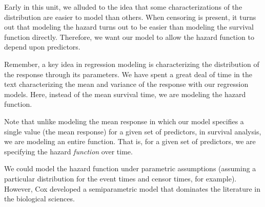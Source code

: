 \documentclass[
  letterpaper,
  DIV=11,
  numbers=noendperiod]{scrreprt}
\theoremstyle{definition}
\theoremstyle{definition}
\theoremstyle{remark}
\begin{document}
Early in this unit, we alluded to the idea that some characterizations
of the distribution are easier to model than others. When censoring is
present, it turns out that modeling the hazard turns out to be easier
than modeling the survival function directly. Therefore, we want our
model to allow the hazard function to depend upon predictors.

\begin{tcolorbox}[enhanced jigsaw, left=2mm, toprule=.15mm, arc=.35mm, breakable, opacitybacktitle=0.6, opacityback=0, rightrule=.15mm, colbacktitle=quarto-callout-note-color!10!white, coltitle=black, leftrule=.75mm, toptitle=1mm, colframe=quarto-callout-note-color-frame, titlerule=0mm, title=\textcolor{quarto-callout-note-color}{\faInfo}\hspace{0.5em}{Note}, bottomrule=.15mm, colback=white, bottomtitle=1mm]

Remember, a key idea in regression modeling is characterizing the
distribution of the response through its parameters. We have spent a
great deal of time in the text characterizing the mean and variance of
the response with our regression models. Here, instead of the mean
survival time, we are modeling the hazard function.

\end{tcolorbox}

\begin{tcolorbox}[enhanced jigsaw, left=2mm, toprule=.15mm, arc=.35mm, breakable, opacitybacktitle=0.6, opacityback=0, rightrule=.15mm, colbacktitle=quarto-callout-note-color!10!white, coltitle=black, leftrule=.75mm, toptitle=1mm, colframe=quarto-callout-note-color-frame, titlerule=0mm, title=\textcolor{quarto-callout-note-color}{\faInfo}\hspace{0.5em}{Note}, bottomrule=.15mm, colback=white, bottomtitle=1mm]

Note that unlike modeling the mean response in which our model specifies
a single value (the mean response) for a given set of predictors, in
survival analysis, we are modeling an entire function. That is, for a
given set of predictors, we are specifying the hazard \emph{function}
over time.

\end{tcolorbox}

We could model the hazard function under parametric assumptions
(assuming a particular distribution for the event times and censor
times, for example). However, Cox developed a semiparametric model that
dominates the literature in the biological sciences.
\end{document}
